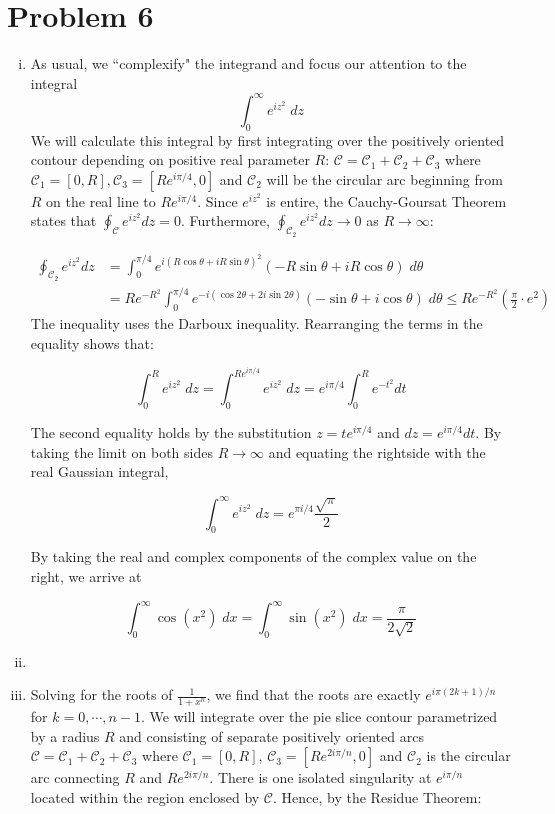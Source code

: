 \documentclass[12pt]{article}%
\newcommand{\C}{\mathcal{C}}
\begin{document}
\section{Problem 6}
\begin{enumerate}[i.]
  \item
  As usual, we ``complexify" the integrand and focus our attention to the integral
  \[ \int_0^\infty e^{i z^2} \; dz \]
  We will calculate this integral by first integrating over the positively oriented contour depending on positive real parameter $R$: $\C = \C_1 + \C_2 + \C_3$ where $\C_1 = [0,R], \C_3 = [Re^{i\pi/4}, 0]$ and $\C_2$ will be the circular arc beginning from $R$ on the real line to $Re^{i\pi/4}$. Since $e^{iz^2}$ is entire, the Cauchy-Goursat Theorem states that $\oint_{\C} e^{iz^2} dz = 0$. Furthermore, $\oint_{\C_2} e^{iz^2} dz \rightarrow 0$ as $R \rightarrow \infty$:

  \begin{align*}
    \oint_{\C_2} e^{iz^2} dz & = \int_0^{\pi/4} e^{i(R\cos{\theta} + iR\sin{\theta})^2} \left(-R\sin{\theta} + iR\cos{\theta}\right) \; d\theta \\
    & =Re^{-R^2}\int_0^{\pi/4}  e^{-i(\cos{2\theta} + 2i\sin{2\theta})} (-\sin{\theta} + i \cos{\theta})\; d\theta
    \leq Re^{-R^2}\left(\frac{\pi}{2} \cdot e^2 \right)
  \end{align*}
  The inequality uses the Darboux inequality. Rearranging the terms in the equality shows that:

  \[ \int_0^R e^{i z^2} \; dz = \int_0^{Re^{i\pi/4}} e^{iz^2} \; dz = e^{i\pi/4}\int_0^R e^{-t^2} dt\]

  The second equality holds by the substitution $z = te^{i\pi/4}$ and $dz =e^{i\pi/4} dt $. By taking the limit on both sides $R \rightarrow \infty$ and equating the rightside with the real Gaussian integral,

  \[ \int_0^\infty e^{i z^2} \; dz = e^{\pi i/4}\frac{\sqrt{\pi}}{2} \]

  By taking the real and complex components of the complex value on the right, we arrive at

  \[  \int_0^\infty \cos(x^2) \; dx = \int_0^\infty \sin(x^2) \; dx = \frac{\pi}{2\sqrt{2}}\]

  \item


  \item
  Solving for the roots of $\frac{1}{1 + x^n}$, we find that the roots are exactly $e^{i\pi(2k+1)/n}$ for $k = 0, \cdots, n-1$. We will integrate over the pie slice contour parametrized by a radius $R$ and consisting of separate positively oriented arcs $\C = \C_1 + \C_2 + \C_3$ where $\C_1 = [0,R]$, $\C_3 = [Re^{2i\pi/n}, 0]$ and $\C_2$ is the circular arc connecting $R$ and $Re^{2i\pi/n}$. There is one isolated singularity at $e^{i\pi/n}$ located within the region enclosed by $\C$. Hence, by the Residue Theorem:


\end{enumerate}
\end{document}
